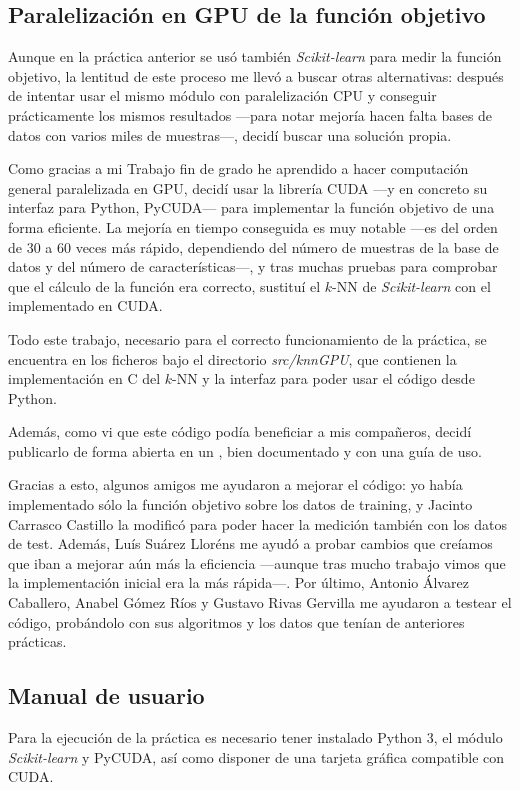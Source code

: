 \documentclass[a4paper, 11pt, titlepage]{article}
\begin{document}
    \subsection{Paralelización en GPU de la función objetivo}

    Aunque en la práctica anterior se usó también \emph{Scikit-learn} para medir la función objetivo, la lentitud de este proceso me llevó a buscar otras alternativas: después de intentar usar el mismo módulo con paralelización CPU y conseguir prácticamente los mismos resultados ---para notar mejoría hacen falta bases de datos con varios miles de muestras---, decidí buscar una solución propia.

    Como gracias a mi Trabajo fin de grado he aprendido a hacer computación general paralelizada en GPU, decidí usar la librería CUDA ---y en concreto su interfaz para Python, PyCUDA--- para implementar la función objetivo de una forma eficiente. La mejoría en tiempo conseguida es muy notable ---es del orden de 30 a 60 veces más rápido, dependiendo del número de muestras de la base de datos y del número de características---, y tras muchas pruebas para comprobar que el cálculo de la función era correcto, sustituí el $k$-NN de \emph{Scikit-learn} con el implementado en CUDA.

    Todo este trabajo, necesario para el correcto funcionamiento de la práctica, se encuentra en los ficheros bajo el directorio \emph{src/knnGPU}, que contienen la implementación en C del $k$-NN y la interfaz para poder usar el código desde Python.

    Además, como vi que este código podía beneficiar a mis compañeros, decidí publicarlo de forma abierta en un , bien documentado y con una guía de uso.

    Gracias a esto, algunos amigos me ayudaron a mejorar el código: yo había implementado sólo la función objetivo sobre los datos de training, y Jacinto Carrasco Castillo la modificó para poder hacer la medición también con los datos de test. Además, Luís Suárez Lloréns me ayudó a probar cambios que creíamos que iban a  mejorar aún más la eficiencia ---aunque tras mucho trabajo vimos que la implementación inicial era la más rápida---. Por último, Antonio Álvarez Caballero, Anabel Gómez Ríos y Gustavo Rivas Gervilla me ayudaron a testear el código, probándolo con sus algoritmos y los datos que tenían de anteriores prácticas.

    \subsection{Manual de usuario}
    Para la ejecución de la práctica es necesario tener instalado Python 3, el módulo \emph{Scikit-learn} y PyCUDA, así como disponer de una tarjeta gráfica compatible con CUDA.
\end{document}
